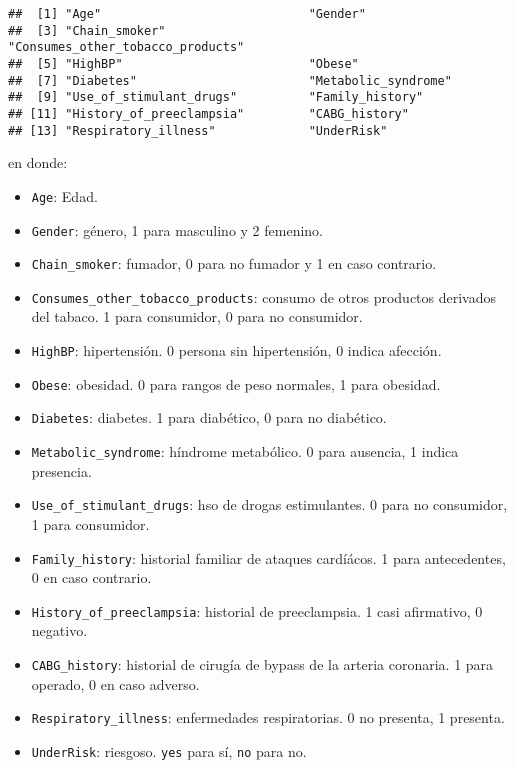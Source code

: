 \documentclass[
  10pt,
  spanish,
]{article}
\providecommand{\tightlist}{%
  \setlength{\itemsep}{0pt}\setlength{\parskip}{0pt}}
\begin{document}
\begin{verbatim}
##  [1] "Age"                             "Gender"                         
##  [3] "Chain_smoker"                    "Consumes_other_tobacco_products"
##  [5] "HighBP"                          "Obese"                          
##  [7] "Diabetes"                        "Metabolic_syndrome"             
##  [9] "Use_of_stimulant_drugs"          "Family_history"                 
## [11] "History_of_preeclampsia"         "CABG_history"                   
## [13] "Respiratory_illness"             "UnderRisk"
\end{verbatim}

en donde:

\begin{itemize}
\tightlist
\item
  \texttt{Age}: Edad.
\item
  \texttt{Gender}: género, 1 para masculino y 2 femenino.
\item
  \texttt{Chain\_smoker}: fumador, 0 para no fumador y 1 en caso
  contrario.
\item
  \texttt{Consumes\_other\_tobacco\_products}: consumo de otros
  productos derivados del tabaco. 1 para consumidor, 0 para no
  consumidor.
\item
  \texttt{HighBP}: hipertensión. 0 persona sin hipertensión, 0 indica
  afección.
\item
  \texttt{Obese}: obesidad. 0 para rangos de peso normales, 1 para
  obesidad.
\item
  \texttt{Diabetes}: diabetes. 1 para diabético, 0 para no diabético.
\item
  \texttt{Metabolic\_syndrome}: híndrome metabólico. 0 para ausencia, 1
  indica presencia.
\item
  \texttt{Use\_of\_stimulant\_drugs}: hso de drogas estimulantes. 0 para
  no consumidor, 1 para consumidor.
\item
  \texttt{Family\_history}: historial familiar de ataques cardíácos. 1
  para antecedentes, 0 en caso contrario.
\item
  \texttt{History\_of\_preeclampsia}: historial de preeclampsia. 1 casi
  afirmativo, 0 negativo.
\item
  \texttt{CABG\_history}: historial de cirugía de bypass de la arteria
  coronaria. 1 para operado, 0 en caso adverso.
\item
  \texttt{Respiratory\_illness}: enfermedades respiratorias. 0 no
  presenta, 1 presenta.
\item
  \texttt{UnderRisk}: riesgoso. \texttt{yes} para sí, \texttt{no} para
  no.
\end{itemize}
\end{document}
